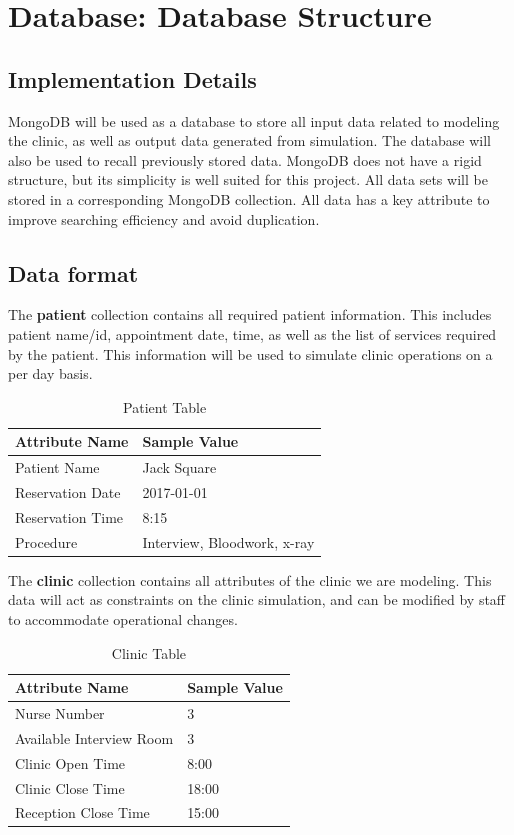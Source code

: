 \documentclass[12pt]{article}
\begin{document}
\section{Database: Database Structure}

\subsection{Implementation Details}
MongoDB will be used as a database to store all input data related to modeling the clinic, as well as output data generated from simulation. The database will also be used to recall previously stored data. MongoDB does not have a rigid structure, but its simplicity is well suited for this project. All data sets will be stored in a corresponding MongoDB collection. All data has a key attribute to improve searching efficiency and avoid duplication.

\subsection{Data format}
The \textbf{patient} collection contains all required patient information. This includes patient name/id, appointment date, time, as well as the list of services required by the patient. This information will be used to simulate clinic operations on a per day basis.
\begin{table}[H]
\centering
\caption{Patient Table}
\label{patient-table}
\begin{tabular}{|l|l|}
\hline
Attribute Name   & Sample Value                \\ \hline
Patient Name     & Jack Square                 \\ \hline
Reservation Date & 2017-01-01                  \\ \hline
Reservation Time & 8:15                        \\ \hline
Procedure        & Interview, Bloodwork, x-ray \\ \hline
\end{tabular}
\end{table}
\hfill

The \textbf{clinic} collection contains all attributes of the clinic we are modeling. This data will act as constraints on the clinic simulation, and can be modified by staff to accommodate operational changes.
\begin{table}[H]
\centering
\caption{Clinic Table}
\label{clinic-table}
\begin{tabular}{|l|l|}
\hline
Attribute Name           & Sample Value \\ \hline
Nurse Number             & 3            \\ \hline
Available Interview Room & 3            \\ \hline
Clinic Open Time         & 8:00         \\ \hline
Clinic Close Time        & 18:00        \\ \hline
Reception Close Time     & 15:00        \\ \hline
\end{tabular}
\end{table}
\end{document}
